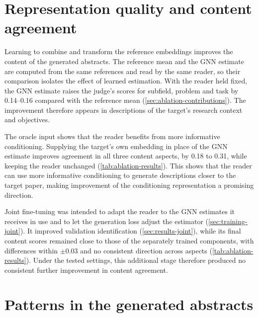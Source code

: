 \section{Representation quality and content agreement}
\label{sec:disc-representation}

Learning to combine and transform the reference embeddings improves the content of the generated abstracts. The reference mean and the GNN estimate are computed from the same references and read by the same reader, so their comparison isolates the effect of learned estimation. With the reader held fixed, the GNN estimate raises the judge's scores for subfield, problem and task by 0.14--0.16 compared with the reference mean (\autoref{sec:ablation-contributions}). The improvement therefore appears in descriptions of the target's research context and objectives.

The oracle input shows that the reader benefits from more informative conditioning. Supplying the target's own embedding in place of the GNN estimate improves agreement in all three content aspects, by 0.18 to 0.31, while keeping the reader unchanged (\autoref{tab:ablation-results}). This shows that the reader can use more informative conditioning to generate descriptions closer to the target paper, making improvement of the conditioning representation a promising direction.

Joint fine-tuning was intended to adapt the reader to the GNN estimates it receives in use and to let the generation loss adjust the estimator (\autoref{sec:training-joint}). It improved validation identification (\autoref{sec:results-joint}), while its final content scores remained close to those of the separately trained components, with differences within $\pm 0.03$ and no consistent direction across aspects (\autoref{tab:ablation-results}). Under the tested settings, this additional stage therefore produced no consistent further improvement in content agreement.

\section{Patterns in the generated abstracts}
\label{sec:disc-patterns}

